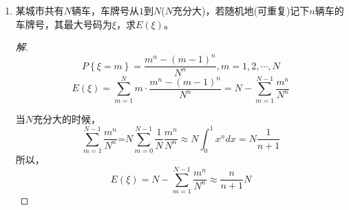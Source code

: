 \documentclass[12pt]{article}
\newcommand{\hei}{\CJKfamily{hei}}                          %
\begin{document}
\begin{enumerate}
\item {\hei 某城市共有$N$辆车，车牌号从$1$到$N$($N$充分大)，若随机地(可重复)记下$n$辆车的车牌号，其最大号码为$\xi$，求$E(\xi)$。}
\begin{proof}[解]
	\begin{equation}
		P\left\{ \xi =m \right\}=\frac{{{m}^{n}}-{{\left( m-1 \right)}^{n}}}{{{N}^{n}}},m=1,2,\cdots ,N
	\end{equation}
	\begin{equation}
		E\left( \xi  \right)=\sum\limits_{m=1}^{N}{m\cdot \frac{{{m}^{n}}-{{\left( m-1 \right)}^{n}}}{{{N}^{n}}}}=N-\sum\limits_{m=1}^{N-1}{\frac{{{m}^{n}}}{{{N}^{n}}}}
	\end{equation}

	当$N$充分大的时候，
	\begin{equation}
		\sum\limits_{m=1}^{N-1}{\frac{{{m}^{n}}}{{{N}^{n}}}}\text{=}N\sum\limits_{m=0}^{N-1}{\frac{1}{N}\frac{{{m}^{n}}}{{{N}^{n}}}\approx N\int_{0}^{1}{{{x}^{n}}dx}}=N\frac{1}{n+1}
	\end{equation}
	所以，
	\begin{equation}
		E\left( \xi  \right)=N-\sum\limits_{m=1}^{N-1}{\frac{{{m}^{n}}}{{{N}^{n}}}}\approx \frac{n}{n+1}N
	\end{equation}
\end{proof}



\end{enumerate}
\end{document}
